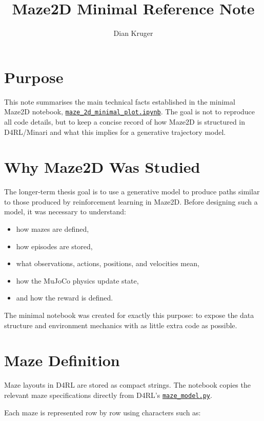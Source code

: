 \documentclass[12pt]{article}
\title{Maze2D Minimal Reference Note}
\author{Dian Kruger}
\date{}
\begin{document}
\maketitle

\section*{Purpose}

This note summarises the main technical facts established in the minimal Maze2D notebook,
\href{./maze_2d_minimal_plot.ipynb}{\texttt{maze\_2d\_minimal\_plot.ipynb}}.
The goal is not to reproduce all code details, but to keep a concise record of how Maze2D is structured in D4RL/Minari and what this implies for a generative trajectory model.

\section*{Why Maze2D Was Studied}

The longer-term thesis goal is to use a generative model to produce paths similar to those produced by reinforcement learning in Maze2D. Before designing such a model, it was necessary to understand:

\begin{itemize}[leftmargin=*]
\item how mazes are defined,
\item how episodes are stored,
\item what observations, actions, positions, and velocities mean,
\item how the MuJoCo physics update state,
\item and how the reward is defined.
\end{itemize}

The minimal notebook was created for exactly this purpose: to expose the data structure and environment mechanics with as little extra code as possible.

\section*{Maze Definition}

Maze layouts in D4RL are stored as compact strings. The notebook copies the relevant maze specifications directly from D4RL's
\href{./d4rl/d4rl/pointmaze/maze_model.py}{\texttt{maze\_model.py}}.

Each maze is represented row by row using characters such as:
\end{document}
